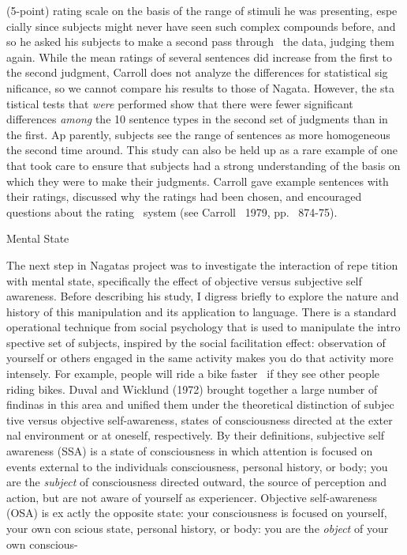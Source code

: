 \clearpage\setcounter{page}{1}\begin{styleStandard}
(5-point) rating scale on the basis of the range of stimuli he was presenting, espe\- cially since subjects might never have seen such complex compounds before, and so he asked his subjects to make a second pass through \ the data, judging them again. While the mean ratings of several sentences did increase from the first to the second judgment, Carroll does not analyze the differences for statistical sig\- nificance, so we cannot compare his results to those of Nagata. However, the sta\- tistical tests that \textit{were}\textit{ }performed show that there were fewer significant differences \textit{among}\textit{ }the 10 sentence types in the second set of judgments than in the first. Ap\- parently, subjects see the range of sentences as more homogeneous the second time around. This study can also be held up as a rare example of one that took care to ensure that subjects had a strong understanding of the basis on which they were to make their judgments. Carroll gave example sentences with their ratings, discussed why the ratings had been chosen, and encouraged questions about the rating \ system (see Carroll \ 1979, pp. \ 874-75).
\end{styleStandard}


\begin{styleHeadingviii}
Mental State
\end{styleHeadingviii}


\begin{styleStandard}
The next step in Nagata{\textquotesingle}s project was to investigate the interaction of repe\- tition with mental state, specifically the effect of objective versus subjective self\- awareness. Before describing his study, I digress briefly to explore the nature and history of this manipulation and its application to language. There is a standard operational technique from social psychology that is used to manipulate the intro\- spective set of subjects, inspired by the social facilitation effect: observation of yourself or others engaged in the same activity makes you do that activity more intensely. For example, people will ride a bike faster \ if they see other people riding bikes. Duval and Wicklund (1972) brought together a large number of findinas in this area and unified them under the theoretical distinction of subjec\- tive versus objective self-awareness, states of consciousness directed at the exter\- nal environment or at oneself, respectively. By their definitions, subjective self\- awareness (SSA) is a state of consciousness in which attention is focused on events external to the individual{\textquotesingle}s consciousness, personal history, or body; you are the \textit{subject}\textit{ }of consciousness directed outward, the source of perception and action, but are not aware of yourself as experiencer. Objective self-awareness (OSA) is ex\- actly the opposite state: your consciousness is focused on yourself, your own con\- scious state, personal history, or body: you are the \textit{object}\textit{ }of your own conscious-
\end{styleStandard}


